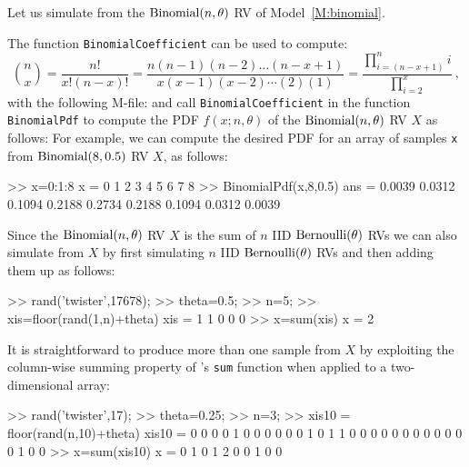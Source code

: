 Let us simulate from the $\binomial(n,\theta)$ RV of Model~\ref{M:binomial}. %
\begin{labwork}\label{LW:BinomialPdf}
The \Matlab function {\tt BinomialCoefficient} can be used to compute:
\[
\binom{n}{x} =  \frac{n !}{x! (n-x)!} = \frac{n(n-1)(n-2)\ldots(n-x+1)}{x(x-1)(x-2)\cdots (2)(1)} = \frac{\prod_{i=(n-x+1)}^n i}{\prod_{i=2}^x} \ ,
\]
with the following M-file:
and call {\tt BinomialCoefficient} in the function {\tt BinomialPdf} to compute the PDF $f(x;n,\theta)$ of the $\binomial(n,\theta)$ RV $X$ as follows:
For example, we can compute the desired PDF for an array of samples {\tt x} from $\mbox{{\rm Binomial}}(8,0.5)$ RV $X$, as follows:
\begin{VrbM}
>> x=0:1:8
x =     0     1     2     3     4     5     6     7     8
>> BinomialPdf(x,8,0.5)
ans =    0.0039    0.0312    0.1094    0.2188    0.2734    0.2188    0.1094    0.0312    0.0039
\end{VrbM}
\end{labwork}

\begin{simulation}[$\binomial(n,\theta)$ as $\sum_{i=1}^n \bernoulli(\theta)$]\label{SIM:BinomialFromBernoulliSum}
Since the $\binomial(n,\theta)$ RV $X$ is the sum of $n$ IID $\mbox{{\rm Bernoulli}}(\theta)$ RVs we can also simulate from $X$ by first simulating $n$ IID $\mbox{{\rm Bernoulli}}(\theta)$ RVs and then adding them up as follows:
\begin{VrbM}
>> rand('twister',17678);
>> theta=0.5; %
>> n=5; %
>> xis=floor(rand(1,n)+theta) %
xis =     1     1     0     0     0
>> x=sum(xis) %
x =     2
\end{VrbM}
It is straightforward to produce more than one sample from $X$ by exploiting the column-wise summing property of \Matlab's {\tt sum} function when applied to a two-dimensional array:
\begin{VrbM}
>> rand('twister',17);
>> theta=0.25; %
>> n=3; %
>> xis10 = floor(rand(n,10)+theta) %
xis10 =
     0     0     0     0     1     0     0     0     0     0
     0     1     0     1     1     0     0     0     0     0
     0     0     0     0     0     0     0     1     0     0
>> x=sum(xis10) %
x =     0     1     0     1     2     0     0     1     0     0
\end{VrbM}
\end{simulation}

